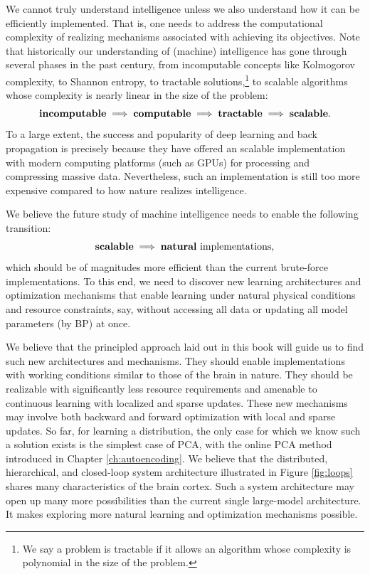 \documentclass[../../book-main.tex]{subfiles}
\begin{document}
We cannot truly understand intelligence unless we also understand how it can be efficiently implemented. That is, one needs to address the computational complexity of realizing mechanisms associated with achieving its objectives. Note that historically our understanding of (machine) intelligence has gone through several phases in the past century, from incomputable concepts like Kolmogorov complexity, to Shannon entropy, to tractable solutions,\footnote{We say a problem is tractable if it allows an algorithm whose complexity is polynomial in the size of the problem.} to scalable algorithms whose complexity is nearly linear in the size of the problem:
\begin{equation}
   \mbox{\textbf{incomputable}} \;
   \Longrightarrow \; \mbox{\textbf{computable}} \;
   \Longrightarrow \; \mbox{\textbf{tractable}} \; \Longrightarrow \; 
   \mbox{\textbf{scalable}}.
\end{equation}
To a large extent, the success and popularity of deep learning and back propagation is precisely because they have offered an scalable implementation with modern computing platforms (such as GPUs) for processing and compressing massive data. Nevertheless, such an implementation is still too more expensive compared to how nature realizes intelligence. 

We believe the future study of machine intelligence needs to enable the following transition:
\begin{equation}
   \mbox{\textbf{scalable}} \; \Longrightarrow \; 
   \mbox{\textbf{natural} implementations},
\end{equation}
which should be of magnitudes more efficient than the current brute-force implementations. To this end, we need to discover new learning architectures and optimization mechanisms that enable learning under natural physical conditions and resource constraints, say, without accessing all data or updating all model parameters (by BP) at once. 

We believe that the principled approach laid out in this book will guide us to find such new architectures and mechanisms. They should enable implementations with working conditions similar to those of the brain in nature. They should be realizable with significantly less resource requirements and amenable to continuous learning with localized and sparse updates. These new mechanisms may involve both backward and forward optimization with local and sparse updates. So far, for learning a distribution, the only case for which we know such a solution exists is the simplest case of PCA, with the online PCA method introduced in Chapter \ref{ch:autoencoding}. We believe that the distributed, hierarchical, and closed-loop system architecture illustrated in Figure \ref{fig:loops} shares many  characteristics of the brain cortex. Such a system architecture may open up many more possibilities than the current single large-model architecture. It makes exploring more natural learning and optimization mechanisms possible. 
\end{document}
